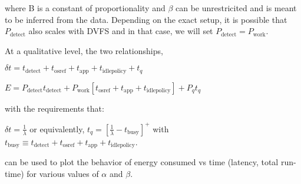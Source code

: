where B is a constant of proportionality and $\beta$ can be unrestricited and is meant to be inferred from the data. Depending on the exact setup, it is possible that $P_{\text{detect}}$ also scales with DVFS and in that case, we will set $P_{\text{detect}} = P_{\text{work}}$.

At a qualitative level, the two relationships,

$\boxed{\delta t = t_{\text{detect}} + t_{\text{osref}} + t_{\text{app}} + t_{\text{idlepolicy}} + t_q}$

$\boxed{E = P_\text{detect} t_{\text{detect}} + P_{\text{work}} \left[t_{\text{osref}} + t_{\text{app}} + t_{\text{idlepolicy}}\right] + P_q t_q}$

with the requirements that:

$\delta t = \frac{1}{\lambda}$ or equivalently, $t_q = \left[\frac{1}{\lambda} - t_\text{busy}\right]^+$ with $t_{\text{busy}} \equiv t_{\text{detect}} + t_{\text{osref}} + t_{\text{app}} + t_{\text{idlepolicy}}$.

can be used to plot the behavior of energy consumed vs time (latency, total run-time) for various values of $\alpha$ and $\beta$.


